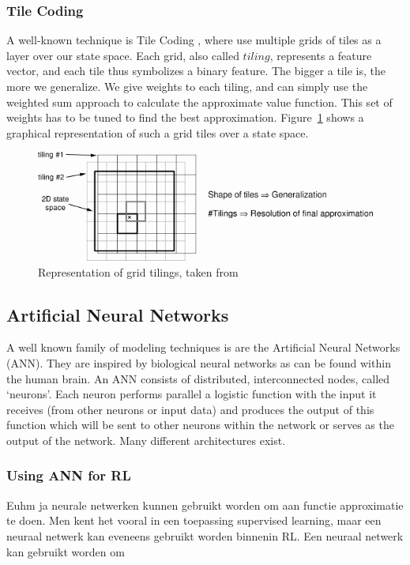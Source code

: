 \documentclass[a4paper,12pt]{article}
\begin{document}
\subsubsection{Tile Coding}
A well-known technique is Tile Coding \cite{sutton1998rl}, where use multiple grids of tiles as a layer over our state space. Each grid, also called $tiling$, represents a feature vector, and each tile thus symbolizes a binary feature. The bigger a tile is, the more we generalize. We give weights to each tiling, and can simply use the weighted sum approach to calculate the approximate value function. This set of weights has to be tuned to find the best approximation. Figure~\ref{fig:figtmp54} shows a graphical representation of such a grid tiles over a state space.
\begin{figure}[H]
\centering
\includegraphics[width=\textwidth]{img/figtmp54}
\caption{Representation of grid tilings, taken from \cite{sutton1998rl}}
\label{fig:figtmp54}
\end{figure}

\subsection{Artificial Neural Networks}
A well known family of modeling techniques is are the Artificial Neural Networks (ANN).
They are inspired by biological neural networks as can be found within the human brain.
An ANN consists of distributed, interconnected nodes, called `neurons'.
Each neuron performs parallel a logistic function with the input it receives (from other neurons or input data) and produces the output of this function which will be sent to other neurons within the network or serves as the output of the network.
Many different architectures exist. 


\subsubsection{Using ANN for RL}
Euhm ja neurale netwerken kunnen gebruikt worden om aan functie approximatie te doen.
Men kent het vooral in een toepassing supervised learning, maar een neuraal netwerk kan eveneens gebruikt worden binnenin RL.
Een neuraal netwerk kan gebruikt worden om 
\end{document}
